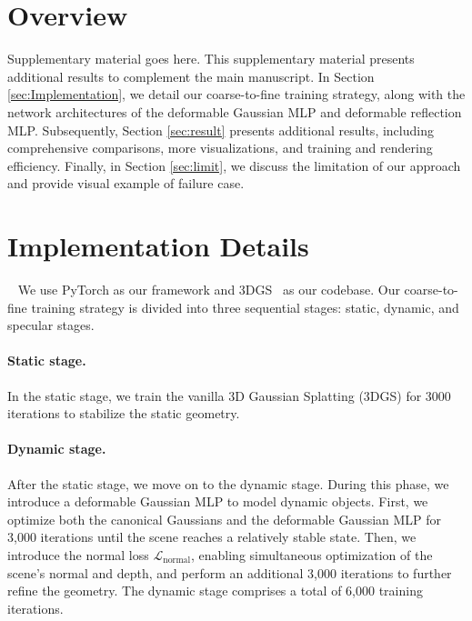 \section{Overview}
\label{sec:appendix_section}
Supplementary material goes here.
This supplementary material presents additional results to complement the main manuscript. In Section \ref{sec:Implementation}, we detail our coarse-to-fine training strategy, along with the network architectures of the deformable Gaussian MLP and deformable reflection MLP. Subsequently, Section \ref{sec:result} presents additional results, including comprehensive comparisons, more visualizations, and training and rendering efficiency. Finally, in Section \ref{sec:limit}, we discuss the limitation of our approach and provide visual example of failure case. 



\section{Implementation Details}~\label{sec:Implementation} We use PyTorch as our framework and 3DGS~\citep{kerbl20233d} as our codebase. Our coarse-to-fine training strategy is divided into three sequential stages: static, dynamic, and specular stages. 
\paragraph{Static stage.} 
In the static stage, we train the vanilla 3D Gaussian Splatting (3DGS) for 3000 iterations to stabilize the static geometry. 
\paragraph{Dynamic stage.} 
After the static stage, we move on to the dynamic stage. During this phase, we introduce a deformable Gaussian MLP to model dynamic objects. First, we optimize both the canonical Gaussians and the deformable Gaussian MLP for 3,000 iterations until the scene reaches a relatively stable state. Then, we introduce the normal loss $\mathcal{L}_{\text{normal}}$, enabling simultaneous optimization of the scene's normal and depth, and perform an additional 3,000 iterations to further refine the geometry.  The dynamic stage comprises a total of 6,000 training iterations.
